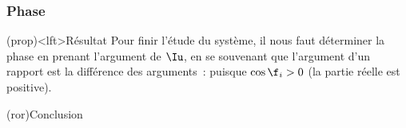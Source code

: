 \documentclass[../../main/main.tex]{subfiles}
\begin{document}
\subsubsection{Phase}
\begin{tcb}(prop)<lft>{Résultat}
	Pour finir l'étude du système, il nous faut déterminer la phase en prenant
	l'argument de $\Iu$, en se souvenant que l'argument d'un rapport est la
	différence des arguments~:
	\psw{
		\begin{gather*}
			\f_i
			= \underbrace{\cancel{\arg*{E_0/R}}}_{=0}
			- \arg*{1 + \jj Q \left(
				\frac{\w}{\w_0} - \frac{\w_0}{\w}
				\right)}
			\\\Lra
			\boxed{\tan\f_i = -Q\left( \frac{\w}{\w_0} - \frac{\w_0}{\w} \right)}
			\qavec
			\boxed{\f_i \in \left] - \frac{\pi}{2}\,; \frac{\pi}{2} \right[}
		\end{gather*}
	}
	puisque $\cos\f_i > 0$ (la partie réelle est positive).
\end{tcb}
\begin{tcb}(ror){Conclusion}
\end{tcb}
\end{document}
